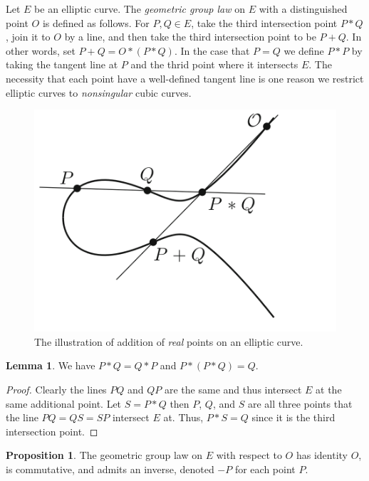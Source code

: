 \documentclass{article}
\theoremstyle{definition}
\newtheorem{lemma}[theorem]{Lemma}
\newtheorem{proposition}[theorem]{Proposition}
\newenvironment{definition}[1][Definition:]{\begin{trivlist}
\item[\hskip \labelsep {\bfseries #1}]}{\end{trivlist}}
\begin{document}
\begin{definition}
Let $E$ be an elliptic curve. The \textit{geometric group law} on $E$ with a distinguished point $O$ is defined as follows. For $P,Q \in E$, take the third intersection point $P * Q$, join
it to $O$ by a line, and then take the third intersection point to
be $P + Q$. In other words, set $P + Q = O * (P * Q)$. In the case that $P = Q$ we define $P * P$ by taking the tangent line at $P$ and the thrid point where it intersects $E$. The necessity that each point have a well-defined tangent line is one reason we restrict elliptic curves to \textit{nonsingular} cubic curves. 
\begin{figure}[H]
\begin{center}
\includegraphics[scale=0.5]{EC1}
\caption{The illustration of addition of \textit{real} points on an elliptic curve.}
\end{center}
\end{figure}
\end{definition}

\begin{lemma}
We have $P * Q = Q * P$ and $P * (P * Q) = Q$.
\end{lemma}

\begin{proof}
Clearly the lines $PQ$ and $QP$ are the same and thus intersect $E$ at the same additional point.
Let $S = P * Q$ then $P$, $Q$, and $S$ are all three points that the line $PQ = QS = SP$ intersect $E$ at. Thus, $P * S = Q$ since it is the third intersection point.
\end{proof}

\begin{proposition}
The geometric group law on $E$ with respect to $O$ has identity $O$, is commutative, and admits an inverse, denoted $-P$ for each point $P$.
\end{proposition}
\end{document}
